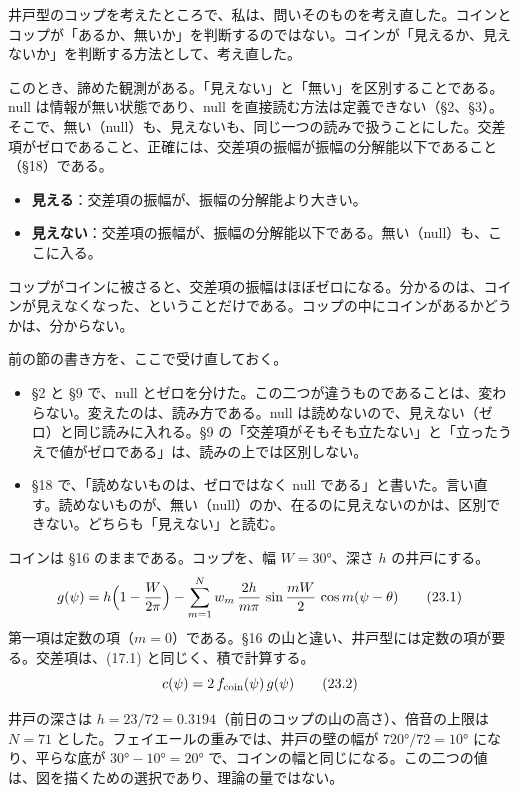 \documentclass[
  a4paper,
]{ltjsarticle}
\providecommand{\tightlist}{%
  \setlength{\itemsep}{0pt}\setlength{\parskip}{0pt}}
\begin{document}
井戸型のコップを考えたところで、私は、問いそのものを考え直した。コインとコップが「あるか、無いか」を判断するのではない。コインが「見えるか、見えないか」を判断する方法として、考え直した。

このとき、諦めた観測がある。「見えない」と「無い」を区別することである。null
は情報が無い状態であり、null
を直接読む方法は定義できない（§2、§3）。そこで、無い（null）も、見えないも、同じ一つの読みで扱うことにした。交差項がゼロであること、正確には、交差項の振幅が振幅の分解能以下であること（§18）である。

\begin{itemize}
\tightlist
\item
  \textbf{見える}：交差項の振幅が、振幅の分解能より大きい。
\item
  \textbf{見えない}：交差項の振幅が、振幅の分解能以下である。無い（null）も、ここに入る。
\end{itemize}

コップがコインに被さると、交差項の振幅はほぼゼロになる。分かるのは、コインが見えなくなった、ということだけである。コップの中にコインがあるかどうかは、分からない。

前の節の書き方を、ここで受け直しておく。

\begin{itemize}
\tightlist
\item
  §2 と §9 で、null
  とゼロを分けた。この二つが違うものであることは、変わらない。変えたのは、読み方である。null
  は読めないので、見えない（ゼロ）と同じ読みに入れる。§9
  の「交差項がそもそも立たない」と「立ったうえで値がゼロである」は、読みの上では区別しない。
\item
  §18 で、「読めないものは、ゼロではなく null
  である」と書いた。言い直す。読めないものが、無い（null）のか、在るのに見えないのかは、区別できない。どちらも「見えない」と読む。
\end{itemize}

コインは §16 のままである。コップを、幅 \(W=30°\)、深さ \(h\)
の井戸にする。 \[
g(\psi) = h\Bigl(1-\frac{W}{2\pi}\Bigr) - \sum_{m=1}^{N} w_m\,\frac{2h}{m\pi}\,\sin\frac{mW}{2}\,\cos m(\psi-\theta) \tag{23.1}
\] 第一項は定数の項（\(m=0\)）である。§16
の山と違い、井戸型には定数の項が要る。交差項は、(17.1)
と同じく、積で計算する。 \[
c(\psi) = 2\,f_{\rm coin}(\psi)\,g(\psi) \tag{23.2}
\]

井戸の深さは \(h=23/72=0.3194\)（前日のコップの山の高さ）、倍音の上限は
\(N=71\) とした。フェイエールの重みでは、井戸の壁の幅が \(720°/72=10°\)
になり、平らな底が \(30°-10°=20°\)
で、コインの幅と同じになる。この二つの値は、図を描くための選択であり、理論の量ではない。
\end{document}
